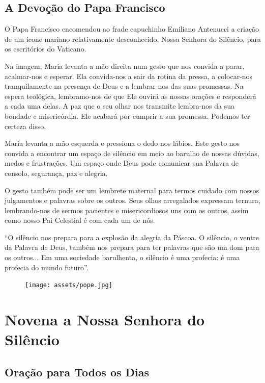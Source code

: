 \documentclass[a4paper,14pt]{extarticle} \usepackage[utf8]{inputenc}
\begin{document}
\subsection{A Devoção do Papa Francisco}

O Papa Francisco encomendou ao frade capuchinho Emiliano Antenucci a criação de um ícone mariano relativamente desconhecido, Nossa Senhora do Silêncio, para os escritórios do Vaticano.

Na imagem, Maria levanta a mão direita num gesto que nos convida a parar, acalmar-nos e esperar. Ela convida-nos a sair da rotina da pressa, a colocar-nos tranquilamente na presença de Deus e a lembrar-nos das suas promessas. Na espera teológica, lembramo-nos de que Ele ouvirá as nossas orações e responderá a cada uma delas. A paz que o seu olhar nos transmite lembra-nos da sua bondade e misericórdia. Ele acabará por cumprir a sua promessa. Podemos ter certeza disso.

Maria levanta a mão esquerda e pressiona o dedo nos lábios. Este gesto nos convida a encontrar um espaço de silêncio em meio ao barulho de nossas dúvidas, medos e frustrações. Um espaço onde Deus pode comunicar sua Palavra de consolo, segurança, paz e alegria.

O gesto também pode ser um lembrete maternal para termos cuidado com nossos julgamentos e palavras sobre os outros. Seus olhos arregalados expressam ternura, lembrando-nos de sermos pacientes e misericordiosos uns com os outros, assim como nosso Pai Celestial é com cada um de nós.

“O silêncio nos prepara para a explosão da alegria da Páscoa. O silêncio, o ventre da Palavra de Deus, também nos prepara para ter palavras que são um dom para os outros... Em uma sociedade barulhenta, o silêncio é uma profecia: é uma profecia do mundo futuro”.


\begin{figure}
  \begin{center}
    \texttt{[image: assets/pope.jpg]}
  \end{center}
\end{figure}



\newpage

\section{Novena a Nossa Senhora do Silêncio}


\subsection*{Oração para Todos os Dias}
\end{document}
